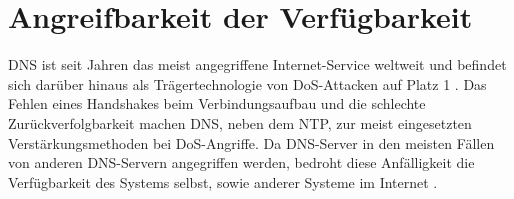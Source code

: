 \section{Angreifbarkeit der Verfügbarkeit}
\label{sec:thread-dosamp}

DNS ist seit Jahren das meist angegriffene Internet-Service weltweit und befindet sich darüber hinaus als Trägertechnologie von DoS-Attacken auf Platz 1 \cite{Alcoy2017}. Das Fehlen eines Handshakes beim Verbindungsaufbau und die schlechte Zurückverfolgbarkeit machen DNS, neben dem \ac{NTP}, zur meist eingesetzten Verstärkungsmethoden bei DoS-Angriffe. Da DNS-Server in den meisten Fällen von anderen DNS-Servern angegriffen werden, bedroht diese Anfälligkeit die Verfügbarkeit des Systems selbst, sowie anderer Systeme im Internet \cite{Kambourakis2008}.